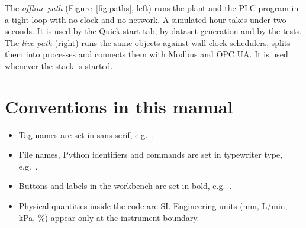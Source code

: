 The \emph{offline path} (Figure~\ref{fig:paths}, left) runs the plant and the
PLC program in a tight loop with no clock and no network. A simulated hour
takes under two seconds. It is used by the Quick start tab, by dataset
generation and by the tests. The \emph{live path} (right) runs the same objects
against wall-clock schedulers, splits them into processes and connects them
with Modbus and OPC UA. It is used whenever the stack is started.

\section{Conventions in this manual}

\begin{itemize}
  \item Tag names are set in sans serif, e.g.\ .
  \item File names, Python identifiers and commands are set in
        typewriter type, e.g.\ .
  \item Buttons and labels in the workbench are set in bold, e.g.\
        .
  \item Physical quantities inside the code are SI. Engineering units
        (mm, L/min, kPa, \%) appear only at the instrument boundary.
\end{itemize}
